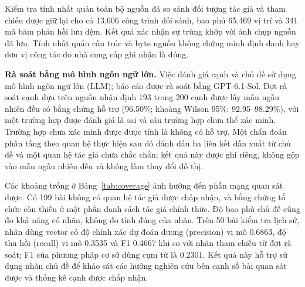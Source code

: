 Kiểm tra tính nhất quán toàn bộ nguồn đã so sánh đối tượng tác giả và tham
chiếu được giữ lại cho cả 13,606 công trình đối sánh, bao phủ 65,469 vị trí và
341 mã băm phản hồi lưu đệm. Kết quả xác nhận sự trùng khớp với ảnh chụp nguồn
đã lưu. Tính nhất quán cấu trúc và byte nguồn không chứng minh định danh hay
đơn vị công tác do nhà cung cấp ghi nhận là đúng.

\textbf{Rà soát bằng mô hình ngôn ngữ lớn.} Việc đánh giá cạnh và chủ đề sử
dụng mô hình ngôn ngữ lớn (LLM); báo cáo được rà soát bằng GPT-6.1-Sol.
Đợt rà soát cạnh dựa trên nguồn nhận định 193 trong 200 cạnh được lấy mẫu ngẫu
nhiên đều có bằng chứng hỗ trợ (96.50\%; khoảng Wilson 95\%:
92.95--98.29\%), với một trường hợp được đánh giá là sai và sáu trường hợp
chưa thể xác minh. Trường hợp chưa xác minh được được tính là không có hỗ trợ.
Một chẩn đoán phân tầng theo quan hệ thực hiện sau đó đánh dấu ba liên kết
dẫn xuất từ chủ đề và một quan hệ tác giả chưa chắc chắn; kết quả này được
ghi riêng, không gộp vào mẫu ngẫu nhiên đều và không làm thay đổi đồ thị.

Các khoảng trống ở Bảng~\ref{tab:coverage} ảnh hưởng đến phần mạng quan sát
được. Có 199 bài không có quan hệ tác giả được chấp nhận, và bằng chứng tổ chức
còn thiếu ở một phần danh sách tác giả chính thức. Độ bao phủ chủ đề cũng đo
khả năng có nhãn, không đo tính đúng của nhãn. Trên 50 bài kiểm tra lịch sử,
nhãn dùng vector có độ chính xác dự đoán dương (precision) vi mô 0.6863, độ thu hồi (recall) vi mô 0.3535 và F1 0.4667 khi so với nhãn tham chiếu từ đợt rà soát; F1 của phương
pháp cơ sở dùng cụm từ là 0.2301. Kết quả này hỗ trợ sử dụng nhãn chủ đề để
khảo sát các hướng nghiên cứu bên cạnh số bài quan sát được và thống kê cạnh
được chấp nhận.
